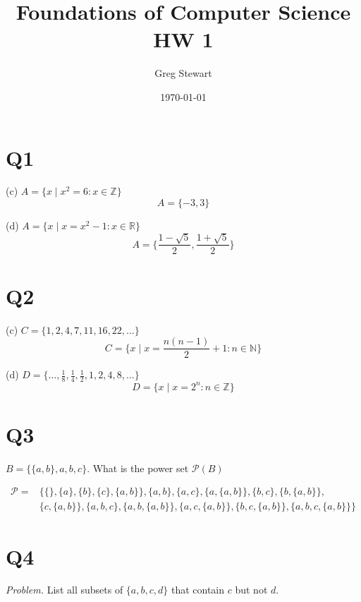 \documentclass{article}
\title{Foundations of Computer Science HW 1}
\author{Greg Stewart}
\date{\today}
\begin{document}
\maketitle

\section*{Q1}

(c) $A = \{x \mid x^2 = 6 : x \in \mathbb{Z} \}$ $$A = \{-3, 3\}$$

\noindent (d) $A = \{x \mid x = x^2-1 : x \in \mathbb{R} \}$ $$A = \Big\{ \frac{1 - \sqrt{5}}{2}, \frac{1+\sqrt{5}}{2} \Big\} $$


\section*{Q2}

(c) $C = \{1, 2, 4, 7, 11, 16, 22, \dots \}$ $$C = \big\{x \mid x = \frac{n(n-1)}{2} + 1 : n \in \mathbb{N}\big\}$$

\noindent (d) $D = \{ \dots , \frac{1}{8}, \frac{1}{4}, \frac{1}{2}, 1, 2, 4, 8, \dots \}$ $$D = \{ x \mid x = 2^n : n \in \mathbb{Z} \}$$



\section*{Q3}

$B = \{\{a,b\}, a, b, c\}$. What is the power set $\mathscr{P}(B)$

\begin{align*}
\mathscr{P} = &\Big\{ \{\}, \{a\}, \{b\}, \{c\}, \big\{a,b\}\big\}, \{a, b\}, \{a,c\}, \big\{a,\{a,b\}\big\}, \{b,c\}, \big\{b, \{a,b\}\big\},  \\
&\big\{c, \{a,b\}\big\}, \{a,b,c\}, \big\{a, b, \{a,b\}\big\}, \big\{a, c, \{a,b\}\big\}, \big\{b, c, \{a,b\}\big\}, \big\{a,b,c,\{a,b\}\big\}\Big\}
\end{align*}


\section*{Q4}

\textit{Problem.} List all subsets of $\{a, b, c, d\}$ that contain $c$ but not $d$.
\end{document}
